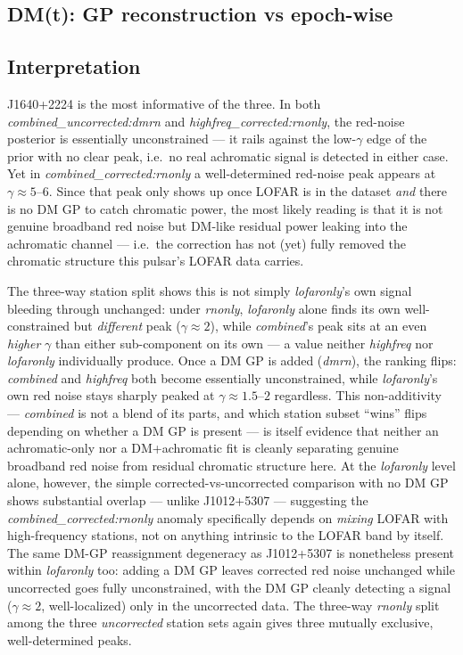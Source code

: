 \subsection{DM(t): GP reconstruction vs epoch-wise}

\subsection{Interpretation}

J1640+2224 is the most informative of the three. In both
\emph{combined\_uncorrected:dmrn} and \emph{highfreq\_corrected:rnonly}, the
red-noise posterior is essentially unconstrained --- it rails against the
low-$\gamma$ edge of the prior with no clear peak, i.e.\ no real achromatic
signal is detected in either case. Yet in \emph{combined\_corrected:rnonly}
a well-determined red-noise peak appears at $\gamma\approx5$--$6$. Since
that peak only shows up once LOFAR is in the dataset \emph{and} there is no
DM GP to catch chromatic power, the most likely reading is that it is not
genuine broadband red noise but DM-like residual power leaking into the
achromatic channel --- i.e.\ the correction has not (yet) fully removed the
chromatic structure this pulsar's LOFAR data carries.

The three-way station split shows this is not simply \emph{lofaronly}'s own
signal bleeding through unchanged: under \emph{rnonly}, \emph{lofaronly}
alone finds its own well-constrained but \emph{different} peak
($\gamma\approx2$), while \emph{combined}'s peak sits at an even
\emph{higher} $\gamma$ than either sub-component on its own --- a value
neither \emph{highfreq} nor \emph{lofaronly} individually produce. Once a DM
GP is added (\emph{dmrn}), the ranking flips: \emph{combined} and
\emph{highfreq} both become essentially unconstrained, while
\emph{lofaronly}'s own red noise stays sharply peaked at
$\gamma\approx1.5$--$2$ regardless. This non-additivity --- \emph{combined}
is not a blend of its parts, and which station subset ``wins'' flips
depending on whether a DM GP is present --- is itself evidence that neither
an achromatic-only nor a DM+achromatic fit is cleanly separating genuine
broadband red noise from residual chromatic structure here. At the
\emph{lofaronly} level alone, however, the simple corrected-vs-uncorrected
comparison with no DM GP shows substantial overlap --- unlike J1012+5307 ---
suggesting the \emph{combined\_corrected:rnonly} anomaly specifically
depends on \emph{mixing} LOFAR with high-frequency stations, not on
anything intrinsic to the LOFAR band by itself. The same DM-GP reassignment
degeneracy as J1012+5307 is nonetheless present within \emph{lofaronly}
too: adding a DM GP leaves corrected red noise unchanged while uncorrected
goes fully unconstrained, with the DM GP cleanly detecting a signal
($\gamma\approx2$, well-localized) only in the uncorrected data. The
three-way \emph{rnonly} split among the three \emph{uncorrected} station
sets again gives three mutually exclusive, well-determined peaks.
